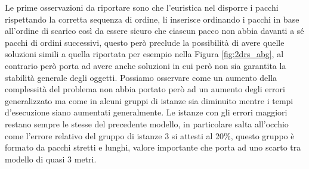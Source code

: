 Le prime osservazioni da riportare sono che l'euristica nel disporre i pacchi rispettando la corretta sequenza di ordine, li inserisce ordinando i pacchi in base all'ordine di scarico così da essere sicuro che ciascun pacco non abbia davanti a sé pacchi di ordini successivi, questo però preclude la possibilità di avere quelle soluzioni simili a quella riportata per esempio nella Figura \ref{fig:2drs_abg}, al contrario però porta ad avere anche soluzioni in cui però non sia garantita la stabilità generale degli oggetti. Possiamo osservare come un aumento della complessità del problema non abbia portato però ad un aumento degli errori generalizzato ma come in alcuni gruppi di istanze sia diminuito mentre i tempi d'esecuzione siano aumentati generalmente. Le istanze con gli errori maggiori restano sempre le stesse del precedente modello, in particolare salta all'occhio come l'errore relativo del gruppo di istanze 3 si attesti al 20\%, questo gruppo è formato da pacchi stretti e lunghi, valore importante che porta ad uno scarto tra modello di quasi 3 metri.

\newpage
